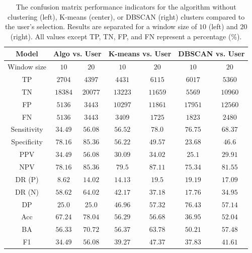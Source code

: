 \documentclass[preprint,12pt]{elsarticle}
\begin{document}
\begin{table}[!ht]
    \centering
    \begin{tabular}{|c|c|c|c|c|c|c|} \hline
        Model & \multicolumn{2}{c|}{Algo vs. User} & \multicolumn{2}{c|}{K-means vs. User} & \multicolumn{2}{c|}{DBSCAN vs. User} \\ \hline
        Window size & $10$ & $20$ & $10$ & $20$ & $10$ & $20$ \\ \hline
        TP & $2704$ & $4397$ & $4431$ & $6115$ & $6017$ & $5360$ \\ \hline
        TN & $18384$ & $20077$ & $13223$ & $11659$ & $5569$ & $10960$ \\ \hline
        FP & $5136$ & $3443$ & $10297$ & $11861$ & $17951$ & $12560$ \\ \hline
        FN & $5136$ & $3443$ & $3409$ & $1725$ & $1823$ & $2480$ \\ \hline
        Sensitivity & $34.49$ & $56.08$ & $56.52$ & $78.0$ & $76.75$ & $68.37$ \\ \hline
        Specificity & $78.16$ & $85.36$ & $56.22$ & $49.57$ & $23.68$ & $46.6$ \\ \hline
        PPV & $34.49$ & $56.08$ & $30.09$ & $34.02$ & $25.1$ & $29.91$ \\ \hline
        NPV & $78.16$ & $85.36$ & $79.5$ & $87.11$ & $75.34$ & $81.55$ \\ \hline
        DR (P) & $8.62$ & $14.02$ & $14.13$ & $19.5$ & $19.19$ & $17.09$ \\ \hline
        DR (N) & $58.62$ & $64.02$ & $42.17$ & $37.18$ & $17.76$ & $34.95$ \\ \hline
        DP & $25.0$ & $25.0$ & $46.96$ & $57.32$ & $76.43$ & $57.14$ \\ \hline
        Acc & $67.24$ & $78.04$ & $56.29$ & $56.68$ & $36.95$ & $52.04$ \\ \hline
        BA & $56.33$ & $70.72$ & $56.37$ & $63.78$ & $50.21$ & $57.48$ \\ \hline
        F1 & $34.49$ & $56.08$ & $39.27$ & $47.37$ & $37.83$ & $41.61$ \\ \hline
    \end{tabular}
    \caption{The confusion matrix performance indicators for the algorithm without clustering (left), K-means (center), or DBSCAN (right) clusters compared to the user's selection. Results are separated for a window size of $10$ (left) and $20$ (right). All values except TP, TN, FP, and FN represent a percentage (\%).}
    \label{tab:DBSCAN_K-meansConfMatrix}
\end{table}
\end{document}
